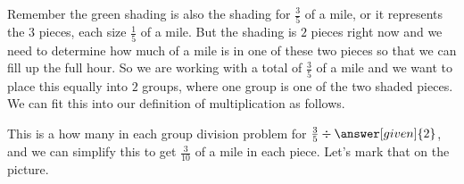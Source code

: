 \documentclass{ximera}
\begin{document}
\begin{example}
Remember the green shading is also the shading for $\frac{3}{5}$ of a mile, or it represents the $3$ pieces, each size $\frac{1}{5}$ of a mile. But the shading is  $2$ pieces right now and we need to determine how much of a mile is in one of these two pieces so that we can fill up the full hour. So we are working with a total of $\frac{3}{5}$ of a mile and we want to place this equally into $2$ groups, where one group is one of the two shaded pieces. We can fit this into our definition of multiplication as follows. 

\begin{image}
\end{image}

This is a how many in each group division problem for $\frac{3}{5} \div \answer[given]{2}$, and we can simplify this to get $\frac{3}{10}$ of a mile in each piece. Let's mark that on the picture.


\end{example}
\end{document}
